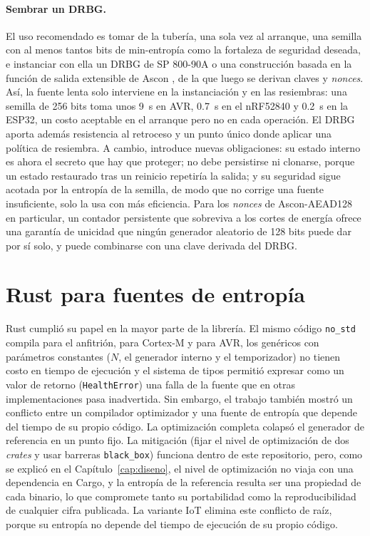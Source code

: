 \paragraph{Sembrar un DRBG.} El uso recomendado es tomar de la tubería, una sola vez al arranque, una semilla con al menos tantos bits de min-entropía como la fortaleza de seguridad deseada, e instanciar con ella un DRBG de SP 800-90A \cite{Barker2015RecommendationGenerators} o una construcción basada en la función de salida extensible de Ascon \cite{Turan2025Ascon-BasedFunctions}, de la que luego se derivan claves y \textit{nonces}. Así, la fuente lenta solo interviene en la instanciación y en las resiembras: una semilla de 256 bits toma unos 9~s en AVR, 0.7~s en el nRF52840 y 0.2~s en la ESP32, un costo aceptable en el arranque pero no en cada operación. El DRBG aporta además resistencia al retroceso y un punto único donde aplicar una política de resiembra. A cambio, introduce nuevas obligaciones: su estado interno es ahora el secreto que hay que proteger; no debe persistirse ni clonarse, porque un estado restaurado tras un reinicio repetiría la salida; y su seguridad sigue acotada por la entropía de la semilla, de modo que no corrige una fuente insuficiente, solo la usa con más eficiencia. Para los \textit{nonces} de Ascon-AEAD128 en particular, un contador persistente que sobreviva a los cortes de energía ofrece una garantía de unicidad que ningún generador aleatorio de 128 bits puede dar por sí solo, y puede combinarse con una clave derivada del DRBG.

\section{Rust para fuentes de entropía}

Rust cumplió su papel en la mayor parte de la librería. El mismo código \texttt{no\_std} compila para el anfitrión, para Cortex-M y para AVR, los genéricos con parámetros constantes ($N$, el generador interno y el temporizador) no tienen costo en tiempo de ejecución y el sistema de tipos permitió expresar como un valor de retorno (\texttt{HealthError}) una falla de la fuente que en otras implementaciones pasa inadvertida. Sin embargo, el trabajo también mostró un conflicto entre un compilador optimizador y una fuente de entropía que depende del tiempo de su propio código. La optimización completa colapsó el generador de referencia en un punto fijo. La mitigación (fijar el nivel de optimización de dos \textit{crates} y usar barreras \texttt{black\_box}) funciona dentro de este repositorio, pero, como se explicó en el Capítulo~\ref{cap:diseno}, el nivel de optimización no viaja con una dependencia en Cargo, y la entropía de la referencia resulta ser una propiedad de cada binario, lo que compromete tanto su portabilidad como la reproducibilidad de cualquier cifra publicada. La variante IoT elimina este conflicto de raíz, porque su entropía no depende del tiempo de ejecución de su propio código.

